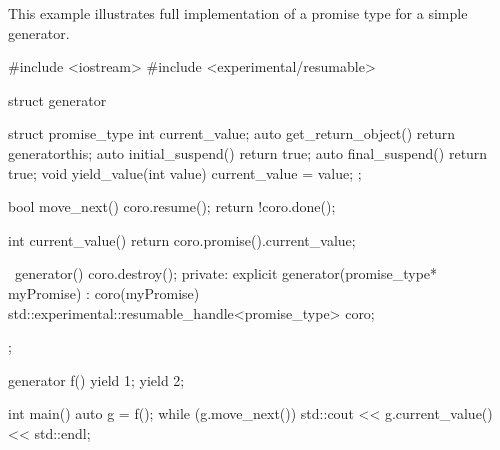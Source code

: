\enterexample
This example illustrates full implementation
of a promise type for a simple generator.
\begin{codeblock}
  #include <iostream>
  #include <experimental/resumable>
  
  struct generator {
    struct promise_type {
      int current_value;
      auto get_return_object() { return generator{this}; }
      auto initial_suspend() { return true; }
      auto final_suspend() { return true; }
      void yield_value(int value) { current_value = value; }
    };
    
    bool move_next() {
      coro.resume();
      return !coro.done();
    }
    
    int current_value() { return coro.promise().current_value; }
    
    ~generator() { coro.destroy(); }
  private:
    explicit generator(promise_type* myPromise) : coro(myPromise) 
    {
    }
    std::experimental::resumable_handle<promise_type> coro;
  };
  
  generator f() {
    yield 1;
    yield 2;
  } 
  
  int main() {
    auto g = f();
    while (g.move_next()) std::cout << g.current_value() << std::endl;
  }
  
\end{codeblock}
\exitexample